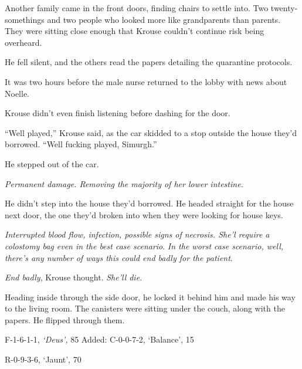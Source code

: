 Another family came in the front doors, finding chairs to settle into.  Two twenty-somethings and two people who looked more like grandparents than parents.  They were sitting close enough that Krouse couldn't continue risk being overheard.



He fell silent, and the others read the papers detailing the quarantine protocols.



It was two hours before the male nurse returned to the lobby with news about Noelle.



Krouse didn't even finish listening before dashing for the door.



\blacksquare



``Well played,'' Krouse said, as the car skidded to a stop outside the house they'd borrowed.  ``Well fucking played, Simurgh.''



He stepped out of the car.



\emph{Permanent damage.  Removing the majority of her lower intestine.}



He didn't step into the house they'd borrowed.  He headed straight for the house next door, the one they'd broken into when they were looking for house keys.



\emph{Interrupted blood flow, infection, possible signs of necrosis.  She'l require a colostomy bag even in the best case scenario}.  \emph{In the worst case scenario, well, there's any number of ways this could end badly for the patient}.



\emph{End badly}, Krouse thought.  \emph{She'll die}.



Heading inside through the side door, he locked it behind him and made his way to the living room.  The canisters were sitting under the couch, along with the papers.  He flipped through them.



  F-1-6-1-1, \emph{`Deus', }85%
Added: C-0-0-7-2, `Balance', 15%



 R-0-9-3-6, `Jaunt', 70%



